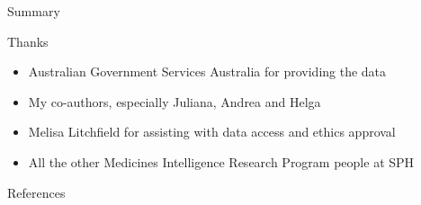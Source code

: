\documentclass[aspectratio=169,12pt]{beamer} %
\begin{document}
\begin{frame}{Summary}
\end{frame}

\begin{frame}{Thanks}
    \begin{itemize}
        \item Australian Government Services Australia for providing the data
	\item My co-authors, especially Juliana, Andrea and Helga
	\item Melisa Litchfield for assisting with data access and ethics approval
	\item All the other Medicines Intelligence Research Program people at SPH
    \end{itemize}
\end{frame}

\begin{frame}{References}
%        
%        
        \tiny
        
\end{frame}
\end{document}

